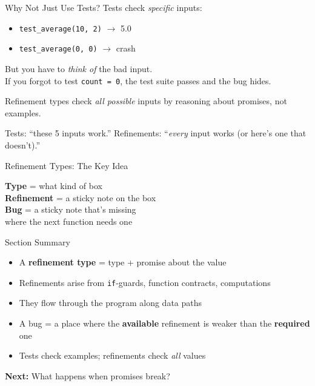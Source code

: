 \documentclass[aspectratio=169,10pt]{beamer}
\newcommand{\warn}[1]{\begin{center}
  \colorbox{warnbg}{\parbox{0.88\textwidth}{\centering\small #1}}\end{center}}
\begin{document}
\begin{frame}{Why Not Just Use Tests?}
Tests check \emph{specific} inputs:
\begin{itemize}
  \item \texttt{test\_average(10, 2)} $\to$ 5.0 \textcolor{safe}{\checkmark}
  \item \texttt{test\_average(0, 0)} $\to$ crash \textcolor{danger}{\texttimes}
\end{itemize}
\vspace{0.3em}
But you have to \emph{think of} the bad input.\\
If you forgot to test \texttt{count = 0}, the test suite passes and the bug hides.
\vspace{0.3em}

Refinement types check \emph{all possible} inputs by reasoning about promises, not examples.
\warn{Tests: ``these 5 inputs work.'' Refinements: ``\emph{every} input works (or here's one that doesn't).''}
\end{frame}

\begin{frame}{Refinement Types: The Key Idea}
\begin{center}
\Large
\textbf{Type} = what kind of box\\[0.4em]
\textbf{Refinement} = a sticky note on the box\\[0.4em]
\textbf{Bug} = a sticky note that's missing\\
where the next function needs one
\end{center}
\end{frame}

\begin{frame}{Section Summary}
\begin{itemize}
  \item A \textbf{refinement type} = type + promise about the value
  \item Refinements arise from \texttt{if}-guards, function contracts, computations
  \item They flow through the program along data paths
  \item A bug = a place where the \textbf{available} refinement is weaker than the \textbf{required} one
  \item Tests check examples; refinements check \emph{all} values
\end{itemize}
\vspace{0.3em}
\begin{center}
\textbf{Next:} What happens when promises break?
\end{center}
\end{frame}
\end{document}
